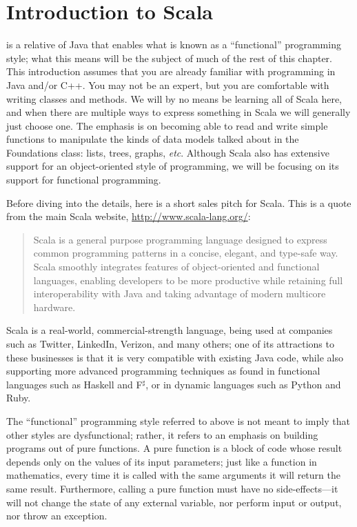 
\section{Introduction to Scala}
 is a relative of Java that enables what is known as a ``functional'' programming style; what this means will be the subject of much of the rest of this chapter. This introduction assumes that you are already familiar with programming in Java and/or C++. You may not be an expert, but you are comfortable with writing classes and methods. We will by no means be learning all of Scala here, and when there are multiple ways to express something in Scala we will generally just choose one. The emphasis is on becoming able to read and write simple functions to manipulate the kinds of data models talked about in the Foundations class: lists, trees, graphs, \textit{etc}. Although Scala also has extensive support for an object-oriented style of programming, we will be focusing on its support for functional programming.

Before diving into the details, here is a short sales pitch for Scala. This is a quote from the main Scala website, \url{http://www.scala-lang.org/}:
\begin{quotation}
Scala is a general purpose programming language designed to express common programming patterns in a concise, elegant, and type-safe way. Scala smoothly integrates features of object-oriented and functional languages, enabling developers to be more productive while retaining full interoperability with Java and taking advantage of modern multicore hardware.
\end{quotation}
Scala is a real-world, commercial-strength language, being used at companies such as Twitter, LinkedIn, Verizon, and many others; one of its attractions to these businesses is that it is very compatible with existing Java code, while also supporting more advanced programming techniques as found in functional languages such as Haskell and F$^\sharp$, or in dynamic languages such as Python and Ruby.

The ``functional'' programming style referred to above is not meant to imply that other styles are dysfunctional; rather, it refers to an emphasis on building programs out of pure functions. A pure function is a block of code whose result depends only on the values of its input parameters; just like a function in mathematics, every time it is called with the same arguments it will return the same result. Furthermore, calling a pure function must have no side-effects---it will not change the state of any external variable, nor perform input or output, nor throw an exception.

